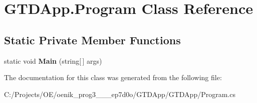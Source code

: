 \hypertarget{class_g_t_d_app_1_1_program}{}\section{G\+T\+D\+App.\+Program Class Reference}
\label{class_g_t_d_app_1_1_program}
\subsection*{Static Private Member Functions}
\begin{DoxyCompactItemize}
\item 
\mbox{\label{class_g_t_d_app_1_1_program_aa6e3cb0801e2598225eef4d9ffc0b2a0}} 
static void {\bfseries Main} (string\mbox{[}$\,$\mbox{]} args)
\end{DoxyCompactItemize}


The documentation for this class was generated from the following file\+:\begin{DoxyCompactItemize}
\item 
C\+:/\+Projects/\+O\+E/oenik\+\_\+prog3\+\_\+\_\+\_\+ep7d0o/\+G\+T\+D\+App/\+G\+T\+D\+App/Program.\+cs\end{DoxyCompactItemize}
